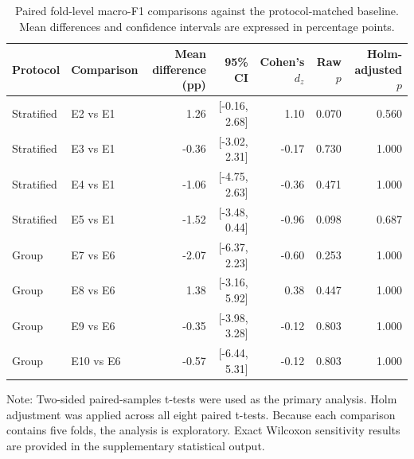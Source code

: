 \begin{table}[htbp]
\centering
\caption{Paired fold-level macro-F1 comparisons against the protocol-matched baseline. Mean differences and confidence intervals are expressed in percentage points.}
\label{tab:fold_level_statistics}
\small
\begin{tabular}{llrrrrr}
\toprule
Protocol & Comparison & Mean difference (pp) & 95\% CI & Cohen's $d_z$ & Raw $p$ & Holm-adjusted $p$ \\
\midrule
Stratified & E2 vs E1 & 1.26 & [-0.16, 2.68] & 1.10 & 0.070 & 0.560 \\
Stratified & E3 vs E1 & -0.36 & [-3.02, 2.31] & -0.17 & 0.730 & 1.000 \\
Stratified & E4 vs E1 & -1.06 & [-4.75, 2.63] & -0.36 & 0.471 & 1.000 \\
Stratified & E5 vs E1 & -1.52 & [-3.48, 0.44] & -0.96 & 0.098 & 0.687 \\
Group & E7 vs E6 & -2.07 & [-6.37, 2.23] & -0.60 & 0.253 & 1.000 \\
Group & E8 vs E6 & 1.38 & [-3.16, 5.92] & 0.38 & 0.447 & 1.000 \\
Group & E9 vs E6 & -0.35 & [-3.98, 3.28] & -0.12 & 0.803 & 1.000 \\
Group & E10 vs E6 & -0.57 & [-6.44, 5.31] & -0.12 & 0.803 & 1.000 \\
\bottomrule
\end{tabular}
\begin{flushleft}
\footnotesize Note: Two-sided paired-samples t-tests were used as the primary analysis. Holm adjustment was applied across all eight paired t-tests. Because each comparison contains five folds, the analysis is exploratory. Exact Wilcoxon sensitivity results are provided in the supplementary statistical output.
\end{flushleft}
\end{table}